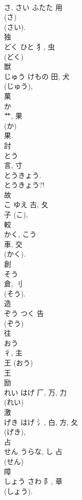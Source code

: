 \documentclass[8pt]{extreport}
\begin{document}
\begin{CJK}{UTF8}{min}
\\	さ, さい	ふたた	用		
\\	(さ) 
\\	(さい).	
\\	独	
\\	どく	ひと	犭, 虫	
\\	(どく) 
\\	獣	
\\	じゅう	けもの	田, 犬	
\\	(じゅう), 
\\	菓	
\\	か	
\\	艹, 果	
\\	(か) 
\\	果.	
\\	討	
\\	とう	
\\	言, 寸	
\\	とうきょう. 
\\	とうきょう?! 
\\	故	
\\	こ	ゆえ	古, 夂	
\\	子 (こ), 
\\	較	
\\	かく, こう	
\\	車, 交	
\\	(かく). 
\\	創	
\\	そう	
\\	倉, 刂	
\\	(そう). 
\\	造	
\\	ぞう	つく	告		
\\	(ぞう) 
\\	往	
\\	おう	
\\	彳, 主	
\\	王 (おう) 
\\	王 
\\	励	
\\	れい	はげ	厂, 万, 力	
\\	(れい) 
\\	激	
\\	げき	はげ	氵, 白, 方, 夂	
\\	(げき), 
\\	占	
\\	せん	うらな, し	占	
\\	(せん) 
\\	障	
\\	しょう	さわ	阝, 章	
\\	(しょう).	

\end{CJK}
\end{document}
